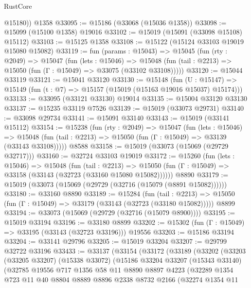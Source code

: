 \begin{lexlean}{RustCore}
\begin{coremodule}
        @15180))
    @1358
@33095 := @15186 (@33068 (@15036 @1358))
@33098 := @15099 (@15100 @1358) @19016
@33102 := @15019 (@15091 (@33098 @15108) @15112)
@33103 := @15125 @1358
@33108 := @15122 (@15124 @33103 @19019 @15080 @15082)
@33119 := fun (params : @15043) =>
  @15045
    (fun (rty : @2049) =>
    @15047
      (fun (lets : @15046) =>
      @15048 (fun (tail : @2213) => @15050 (fun (Γ : @15049) => @33075 (@33102 @33108)))))
@33120 := @15044 @33119
@33121 := @15041 @33120
@33130 := @15148
    (fun (U : @15147) => @15149 (fun (t : @7) => @15157 (@15019 (@15163 @19016 @15037) @15174)))
@33133 := @33095 (@33121 @33130) @19014
@33135 := @15004 @33120 @33130
@33137 := @15235 @33119 @7526
@33139 := @15019 (@33073 @29731)
@33140 := @33098 @29734
@33141 := @15091 @33140
@33143 := @15019 (@33141 @15112)
@33154 := @15238
    (fun (rty : @2049) =>
    @15047
      (fun (lets : @15046) =>
      @15048 (fun (tail : @2213) => @15050 (fun (Γ : @15049) => @33139 (@33143 @33108)))))
    @8588
@33158 := @15019 (@33073 (@15069 (@29729 @32717)))
@33160 := @32724 @33103 @19019
@33172 := @15260
    (fun (lets : @15046) =>
    @15048
      (fun (tail : @2213) =>
      @15050 (fun (Γ : @15049) => @33158 (@33143 (@32723 (@33160 @15080 @15082))))))
    @8890
@33179 := @15019 (@33073 (@15069 (@29729 (@32716 (@15079 (@8891 @15082))))))
@33180 := @33160 @8890
@33189 := @15284
    (fun (tail : @2213) => @15050 (fun (Γ : @15049) => @33179 (@33143 (@32723 (@33180 @15082)))))
    @8899
@33194 := @33073 (@15069 (@29729 (@32716 (@15079 @8900))))
@33195 := @15019 @33194
@33196 := @33180 @8899
@33202 := @15302 (fun (Γ : @15049) => @33195 (@33143 (@32723 @33196))) @19556
@33203 := @15186 @33194
@33204 := @33141 @29796
@33205 := @15019 @33204
@33207 := @29799 @32722 @33196
@33433 := @33137
    (@33154
      (@33172
        (@33189
          (@33202
            (@33203
              (@33205 @33207)
              (@15338 @33072)
              (@15186
                @33204
                @33207
                (@15343 @33140)
                (@32785
                  @19556
                  @717
                  @1356
                  @58
                  @11
                  @8890
                  @8897
                  @4223
                  (@32289
                    @1354
                    @723
                    @11
                    @40
                    @8804
                    @8889
                    @8896
                    @2338
                    @8732
                    @2166
                    (@32274
                      @1354
                      @11

\end{coremodule}
\end{lexlean}
